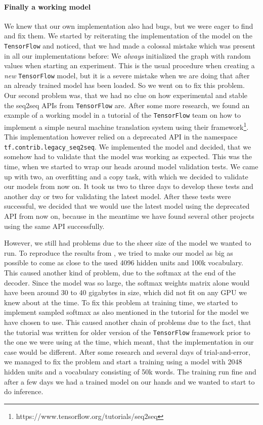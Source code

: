 \paragraph{Finally a working model} We knew that our own implementation also had bugs, but we were eager to find and fix them. We started by reiterating the implementation of the model on the \texttt{TensorFlow} and noticed, that we had made a colossal mistake which was present in all our implementations before: We \emph{always} initialized the graph with random values when starting an experiment. This is the usual procedure when creating a \emph{new} \texttt{TensorFlow} model, but it is a severe mistake when we are doing that after an already trained model has been loaded. So we went on to fix this problem. Our second problem was, that we had no clue on how experimental and stable the seq2seq APIs from \texttt{TensorFlow} are. After some more research, we found an example of a working model in a tutorial of the \texttt{TensorFlow} team on how to implement a simple neural machine translation system using their framework\footnote{https://www.tensorflow.org/tutorials/seq2seq}. This implementation however relied on a deprecated API in the namespace \texttt{tf.contrib.legacy\_seq2seq}. We implemented the model and decided, that we somehow had to validate that the model was working as expected. This was the time, when we started to wrap our heads around model validation tests. We came up with two, an overfitting and a copy task, with which we decided to validate our models from now on. It took us two to three days to develop these tests and another day or two for validating the latest model. After these tests were successful, we decided that we would use the latest model using the deprecated API from now on, because in the meantime we have found several other projects using the same API successfully.

However, we still had problems due to the sheer size of the model we wanted to run. To reproduce the results from \cite{Vinyals:2015}, we tried to make our model as big as possible to come as close to the used 4096 hidden units and 100k vocabulary. This caused another kind of problem, due to the softmax at the end of the decoder. Since the model was so large, the softmax weights matrix alone would have been around 30 to 40 gigabytes in size, which did not fit on any GPU we knew about at the time. To fix this problem at training time, we started to implement sampled softmax as also mentioned in the tutorial for the model we have chosen to use. This caused another chain of problems due to the fact, that the tutorial was written for older version of the \texttt{TensorFlow} framework prior to the one we were using at the time, which meant, that the implementation in our case would be different. After some research and several days of trial-and-error, we managed to fix the problem and start a training using a model with 2048 hidden units and a vocabulary consisting of 50k words. The training run fine and after a few days we had a trained model on our hands and we wanted to start to do inference.

